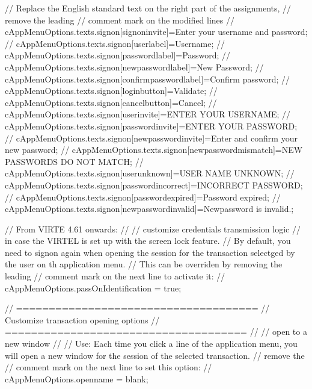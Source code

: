 \documentclass[letterpaper,10pt,english]{sphinxmanual}
\begin{document}
\begin{sphinxVerbatim}[commandchars=\\\{\}]
// Replace the English standard text on the right part of the assignments,
// remove the leading // comment mark on the modified lines
//  cAppMenuOptions.texts.signon[\PYGZdq{}signon\PYGZhy{}invite\PYGZdq{}]=\PYGZdq{}Enter your username and password\PYGZdq{};
//  cAppMenuOptions.texts.signon[\PYGZdq{}user\PYGZhy{}label\PYGZdq{}]=\PYGZdq{}Username\PYGZdq{};
//  cAppMenuOptions.texts.signon[\PYGZdq{}password\PYGZhy{}label\PYGZdq{}]=\PYGZdq{}Password\PYGZdq{};
//  cAppMenuOptions.texts.signon[\PYGZdq{}newpassword\PYGZhy{}label\PYGZdq{}]=\PYGZdq{}New Password\PYGZdq{};
//  cAppMenuOptions.texts.signon[\PYGZdq{}confirmpassword\PYGZhy{}label\PYGZdq{}]=\PYGZdq{}Confirm password\PYGZdq{};
//  cAppMenuOptions.texts.signon[\PYGZdq{}login\PYGZhy{}button\PYGZdq{}]=\PYGZdq{}Validate\PYGZdq{};
//  cAppMenuOptions.texts.signon[\PYGZdq{}cancel\PYGZhy{}button\PYGZdq{}]=\PYGZdq{}Cancel\PYGZdq{};
//  cAppMenuOptions.texts.signon[\PYGZdq{}user\PYGZhy{}invite\PYGZdq{}]=\PYGZdq{}ENTER YOUR USERNAME\PYGZdq{};
//  cAppMenuOptions.texts.signon[\PYGZdq{}password\PYGZhy{}invite\PYGZdq{}]=\PYGZdq{}ENTER YOUR PASSWORD\PYGZdq{};
//  cAppMenuOptions.texts.signon[\PYGZdq{}newpassword\PYGZhy{}invite\PYGZdq{}]=\PYGZdq{}Enter and confirm your new password\PYGZdq{};
//  cAppMenuOptions.texts.signon[\PYGZdq{}newpassword\PYGZhy{}mismatch\PYGZdq{}]=\PYGZdq{}NEW PASSWORDS DO NOT MATCH\PYGZdq{};
//  cAppMenuOptions.texts.signon[\PYGZdq{}user\PYGZhy{}unknown\PYGZdq{}]=\PYGZdq{}USER NAME UNKNOWN\PYGZdq{};
//  cAppMenuOptions.texts.signon[\PYGZdq{}password\PYGZhy{}incorrect\PYGZdq{}]=\PYGZdq{}INCORRECT PASSWORD\PYGZdq{};
//  cAppMenuOptions.texts.signon[\PYGZdq{}password\PYGZhy{}expired\PYGZdq{}]=\PYGZdq{}Password expired\PYGZdq{};
//  cAppMenuOptions.texts.signon[\PYGZdq{}newpassword\PYGZhy{}invalid\PYGZdq{}]=\PYGZdq{}Newpassword is invalid.\PYGZdq{};

// From VIRTE 4.61 onwards:
// \PYGZhy{}\PYGZhy{}\PYGZhy{}\PYGZhy{}\PYGZhy{}\PYGZhy{}\PYGZhy{}\PYGZhy{}\PYGZhy{}\PYGZhy{}\PYGZhy{}\PYGZhy{}\PYGZhy{}\PYGZhy{}\PYGZhy{}\PYGZhy{}\PYGZhy{}\PYGZhy{}\PYGZhy{}\PYGZhy{}\PYGZhy{}\PYGZhy{}\PYGZhy{}
// customize credentials transmission logic
// in case the VIRTEL is set up with the screen lock feature.
// By default, you need to signon again when opening the session for the transaction selectged by the user on th application menu.
// This can be overriden by removing the leading // comment mark on the next line to activate it:
// cAppMenuOptions.passOnIdentification = true;


// =====================================
// Customize transaction opening options
// =====================================
//
// open to a new window
// \PYGZhy{}\PYGZhy{}\PYGZhy{}\PYGZhy{}\PYGZhy{}\PYGZhy{}\PYGZhy{}\PYGZhy{}\PYGZhy{}\PYGZhy{}\PYGZhy{}\PYGZhy{}\PYGZhy{}\PYGZhy{}\PYGZhy{}\PYGZhy{}\PYGZhy{}\PYGZhy{}\PYGZhy{}\PYGZhy{}
// Use: Each time you click a line of the application menu, you will open a new window for the session of the selected transaction.
// remove the // comment mark on the next line to set this option:
// cAppMenuOptions.open\PYGZus{}name = \PYGZdq{}\PYGZus{}blank\PYGZdq{};


\end{sphinxVerbatim}
\end{document}
